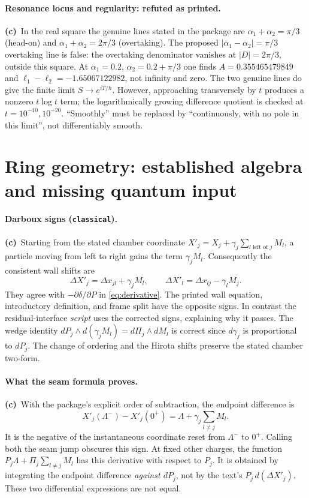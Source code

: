 \documentclass[11pt,a4paper]{article}
\newcommand{\Lc}{\textbf{(c)}\ }
\begin{document}
\paragraph{Resonance locus and regularity: refuted as printed.}
\Lc In the real square the genuine lines stated in the package are
$\alpha_1+\alpha_2=\pi/3$ (head-on) and
$\alpha_1+\alpha_2=2\pi/3$ (overtaking). The proposed
$|\alpha_1-\alpha_2|=\pi/3$ overtaking line is false: the overtaking
denominator vanishes at $|D|=2\pi/3$, outside this square.
At $\alpha_1=0.2$, $\alpha_2=0.2+\pi/3$ one finds
$A=0.355465479849$ and $\ell_1-\ell_2=-1.65067122982$, not infinity and zero.
The two genuine lines do give the finite limit $S\to e^{iT/\hbar}$.
However, approaching transversely by $t$ produces a nonzero $t\log t$
term; the logarithmically growing difference quotient is checked at
$t=10^{-10},10^{-20}$. ``Smoothly'' must be replaced by ``continuously,
with no pole in this limit'', not differentiably smooth.

\section{Ring geometry: established algebra and missing quantum input}
\paragraph{Darboux signs (\texttt{classical}).}
\Lc Starting from the stated chamber coordinate
$X'_j=X_j+\gamma_j\sum_{l\text{ left of }j}M_l$,
a particle moving from left to right gains the term $\gamma_jM_l$.
Consequently the consistent wall shifts are
\begin{equation}
 \Delta X'_j=\Delta x_{jl}+\gamma_jM_l,
 \qquad \Delta X'_l=\Delta x_{lj}-\gamma_lM_j.
 \label{eq:correctwall}
\end{equation}
They agree with $-\partial\delta/\partial P$ in
\eqref{eq:derivative}. The printed wall equation, introductory definition,
and frame split have the opposite signs. In contrast the residual-interface
\emph{script} uses the corrected signs, explaining why it passes.
The wedge identity $dP_j\wedge d(\gamma_jM_l)=d\Pi_j\wedge dM_l$
is correct since $d\gamma_j$ is proportional to $dP_j$. The change of ordering
and the Hirota shifts preserve the stated chamber two-form.

\paragraph{What the seam formula proves.}
\Lc With the package's explicit order of subtraction, the endpoint difference is
\begin{equation}
 X'_j(\Lambda^-)-X'_j(0^+)=\Lambda+\gamma_j\sum_{l\ne j}M_l.
\end{equation}
It is the negative of the instantaneous coordinate reset from $\Lambda^-$
to $0^+$. Calling both the seam jump obscures this sign. At fixed other charges,
the function $P_j\Lambda+\Pi_j\sum_{l\ne j}M_l$ has this derivative with
respect to $P_j$. It is obtained by integrating the endpoint difference
\emph{against $dP_j$}, not by the text's $P_j\,d(\Delta X'_j)$.
These two differential expressions are not equal.
\end{document}
